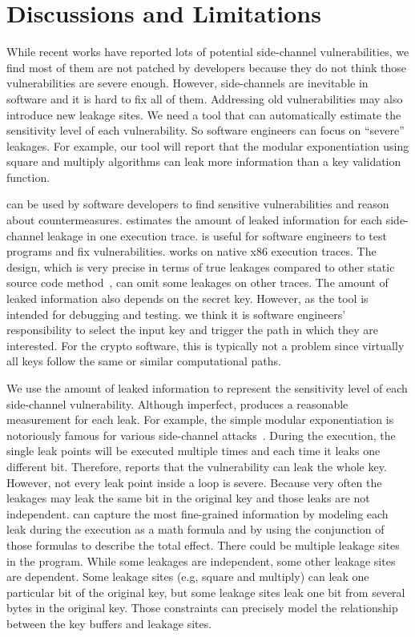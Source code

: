 \section{Discussions and Limitations}
While recent works have reported lots
of potential side-channel vulnerabilities, we find most of them are not patched by
developers because they do not think those vulnerabilities are severe enough.
However, side-channels are inevitable in software and it is hard to fix all of them. 
Addressing old vulnerabilities may also introduce new leakage
sites. We need a
tool that can automatically estimate the sensitivity level of each vulnerability.
So software engineers can focus on
``severe'' leakages. For example, our tool will report that 
the modular exponentiation using square and multiply algorithms can
leak more information than a key validation function.

\tool{} can be used by software developers to find sensitive vulnerabilities
and reason about countermeasures.
\tool{} estimates the amount of leaked information for each side-channel leakage
in one execution trace. \tool{} is useful for software
engineers to test programs and fix vulnerabilities.
\tool{} works on native x86 execution traces. The design, which is very
precise in terms of true leakages compared to other static source code
method~\cite{197207,BacelarAlmeida:2013:FVS:2483313.2483334}, can omit some
leakages on other traces. The amount of leaked information also depends on the secret key.
However, as the tool is intended for debugging and testing.
we think it is software engineers' responsibility to select the input key and trigger the 
path in which they are interested. For the crypto software, this is typically not
a problem since virtually all keys follow the same or similar computational paths.

We use the amount of leaked information to represent the sensitivity level of each
side-channel vulnerability. Although imperfect, \tool{} produces a reasonable
measurement for each leak. For example, the simple modular exponentiation is notoriously
famous for various side-channel attacks~\cite{kocher1996timing}. During the execution, the single 
leak points will be executed multiple times and each time it leaks one different bit.
Therefore, \tool{} reports that the vulnerability can leak the whole key. However, not every
leak point inside a loop is severe. Because very often the leakages may leak the same
bit in the original key and those leaks are not independent. \tool{} can capture the most 
fine-grained information by
modeling each leak during the execution 
as a math formula and by using the conjunction of those formulas to describe the total effect.
There could be multiple leakage sites in the program. While some leakages are independent,
some other leakage sites are dependent. Some leakage sites (e.g, square and multiply) can leak one particular bit 
of the original key, but some leakage sites leak one bit from several bytes in the original
key. Those constraints can precisely model the relationship between the key buffers
and leakage sites.

